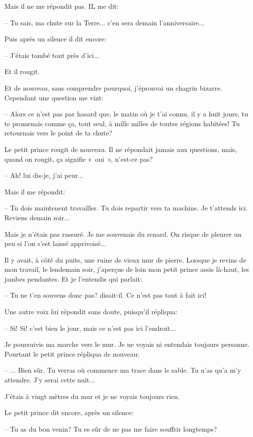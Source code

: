 \documentclass[a4paper]{report}
\begin{document}
Mais il ne me répondit pas. IL me dit:

-- Tu sais, ma chute sur la Terre... c'en sera demain l'anniversaire...

Puis après un silence il dit encore:

-- J'étais tombé tout près d'ici...

Et il rougit.

Et de nouveau, sans comprendre pourquoi, j'éprouvai un chagrin bizarre. Cependant une question me vint:

-- Alors ce n'est pas par hasard que, le matin où je t'ai connu, il y a huit jours, tu te promenais comme ça, tout seul, à mille milles de toutes régions habitées! Tu retournais vers le point de ta chute?

Le petit prince rougit de nouveau. Il ne répondait jamais aux questions, mais, quand on rougit, ça signifie «~oui~», n'est-ce pas?

-- Ah! lui dis-je, j'ai peur...

Mais il me répondit:

-- Tu dois maintenent travailler. Tu dois repartir vers ta machine. Je t'attends ici. Reviens demain soir...

Mais je n'étais pas rassuré. Je me souvenais du renard. On risque de pleurer un peu si l'on s'est laissé apprivoisé...

\parachapter{} %
Il y avait, à côté du puits, une ruine de vieux mur de pierre. Lorsque je revins de mon travail, le lendemain soir, j'aperçus de loin mon petit prince assis là-haut, les jambes pendantes. Et je l'entendis qui parlait:

-- Tu ne t'en souvens donc pas? disait-il. Ce n'est pas tout à fait ici!

Une autre voix lui répondit sans doute, puisqu'il répliqua:

-- Si! Si! c'est bien le jour, mais ce n'est pas ici l'endroit...

Je poursuivis ma marche vers le mur. Je ne voyais ni entendais toujours personne. Pourtant le petit prince répliqua de nouveau:

-- ... Bien sûr. Tu verras où commence ma trace dans le sable. Tu n'as qu'a m'y attendre. J'y serai cette nuit...

J'étais à vingt mètres du mur et je ne voyais toujours rien.

Le petit prince dit encore, après un silence:

-- Tu as du bon venin? Tu es sûr de ne pas me faire souffrir longtemps?
\end{document}
